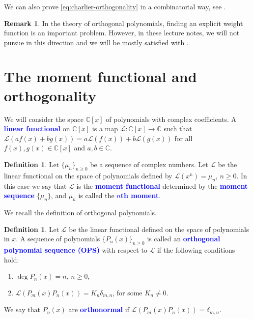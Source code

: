 \documentclass[oneside]{book}
\numberwithin{equation}{section}
\theoremstyle{definition}
\newtheorem{defn}[thm]{Definition}
\newtheorem{remark}[thm]{Remark}
\newcommand{\CC}{\mathbb{C}}
\newcommand\LL{\mathcal{L}}
\renewcommand\emph[1]{\textcolor{blue}{\bf #1}}
\begin{document}
We can also prove \eqref{eq:charlier-orthogonality} in a combinatorial
way, see .




\begin{remark}
  In the theory of orthogonal polynomials, finding an explicit weight
  function is an important problem. However, in these lecture notes,
  we will not pursue in this direction and we will be mostly satisfied
  with .
\end{remark}


\section{The moment functional and orthogonality}

We will consider the space \( \CC[x] \) of polynomials with complex
coefficients. A \emph{linear functional} on \( \CC[x] \) is a map
\( \LL:\CC[x] \to \CC \) such that
\( \LL(af(x)+bg(x)) = a\LL(f(x)) + b\LL(g(x)) \) for all
\( f(x), g(x)\in \CC[x] \) and \( a,b\in \CC \).

\begin{defn}
  Let \( \{\mu_{n}\}_{n\ge0} \) be a sequence of complex numbers. Let
  \( \LL \) be the linear functional on the space of polynomials
  defined by \( \LL(x^n) = \mu_n \), \( n\ge0 \). In this case we say
  that \( \LL \) is the \emph{moment functional} determined by the
  \emph{moment sequence} \( \{\mu_n\} \), and \( \mu_n \) is called
  the \emph{\( n \)th moment}.
\end{defn}

We recall the definition of orthogonal polynomials.

\begin{defn}
  Let \( \LL \) be the linear functional defined on the space of
  polynomials in \( x \). A sequence of polynomials
  \( \{P_n(x)\}_{n\ge0} \) is called an \emph{orthogonal polynomial
    sequence (OPS)} with respect to \( \LL \) if the following
  conditions hold:
  \begin{enumerate}
  \item \( \deg P_n(x) = n \), \( n\ge0 \),
  \item \( \LL(P_m(x)P_n(x))  = K_n \delta_{m,n} \), for some \( K_n\ne 0 \).
  \end{enumerate}
\end{defn}

We say that \( P_n(x) \) are \emph{orthonormal} if
\( \LL(P_m(x)P_n(x)) = \delta_{m,n} \).
\end{document}
